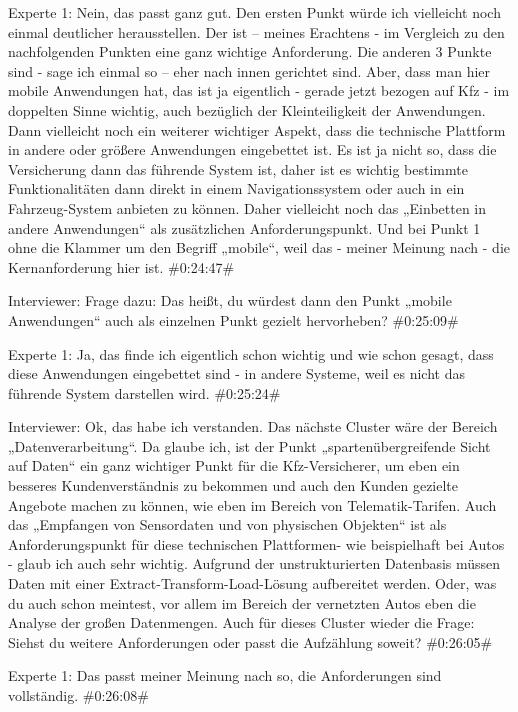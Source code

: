Experte 1:
Nein, das passt ganz gut. Den ersten Punkt würde ich vielleicht noch einmal deutlicher herausstellen. Der ist – meines Erachtens - im Vergleich zu den nachfolgenden Punkten eine ganz wichtige Anforderung. Die anderen 3 Punkte sind - sage ich einmal so – eher nach innen gerichtet sind. Aber, dass man hier mobile Anwendungen hat, das ist ja eigentlich - gerade jetzt bezogen auf Kfz - im doppelten Sinne wichtig, auch bezüglich der Kleinteiligkeit der Anwendungen. Dann vielleicht noch ein weiterer wichtiger Aspekt, dass die technische Plattform in andere oder größere Anwendungen eingebettet ist. Es ist ja nicht so, dass die Versicherung dann das führende System ist, daher ist es wichtig bestimmte Funktionalitäten dann direkt in einem Navigationssystem oder auch in ein Fahrzeug-System anbieten zu können. Daher vielleicht noch das „Einbetten in andere Anwendungen“ als zusätzlichen Anforderungspunkt. Und bei Punkt 1 ohne die Klammer um den Begriff „mobile“, weil das - meiner Meinung nach - die Kernanforderung hier ist. 
\#0:24:47\#

Interviewer:
Frage dazu: Das heißt, du würdest dann den Punkt „mobile Anwendungen“ auch als einzelnen Punkt gezielt hervorheben? 
\#0:25:09\#

Experte 1:
Ja, das finde ich eigentlich schon wichtig und wie schon gesagt, dass diese Anwendungen eingebettet sind - in andere Systeme, weil es nicht das führende System darstellen wird.
\#0:25:24\#

Interviewer:
Ok, das habe ich verstanden. Das nächste Cluster wäre der Bereich „Datenverarbeitung“. Da glaube ich, ist der Punkt „spartenübergreifende Sicht auf Daten“ ein ganz wichtiger Punkt für die Kfz-Versicherer, um eben ein besseres Kundenverständnis zu bekommen und auch den Kunden gezielte Angebote machen zu können, wie eben im Bereich von Telematik-Tarifen. Auch das „Empfangen von Sensordaten und von physischen Objekten“ ist als Anforderungspunkt für diese technischen Plattformen- wie beispielhaft bei Autos - glaub ich auch sehr wichtig. Aufgrund der unstrukturierten Datenbasis müssen Daten mit einer Extract-Transform-Load-Lösung aufbereitet werden. Oder, was du auch schon meintest, vor allem im Bereich der vernetzten Autos eben die Analyse der großen Datenmengen. Auch für dieses Cluster wieder die Frage: Siehst du weitere Anforderungen oder passt die Aufzählung soweit?
\#0:26:05\#

Experte 1:
Das passt meiner Meinung nach so, die Anforderungen sind vollständig.
\#0:26:08\#

